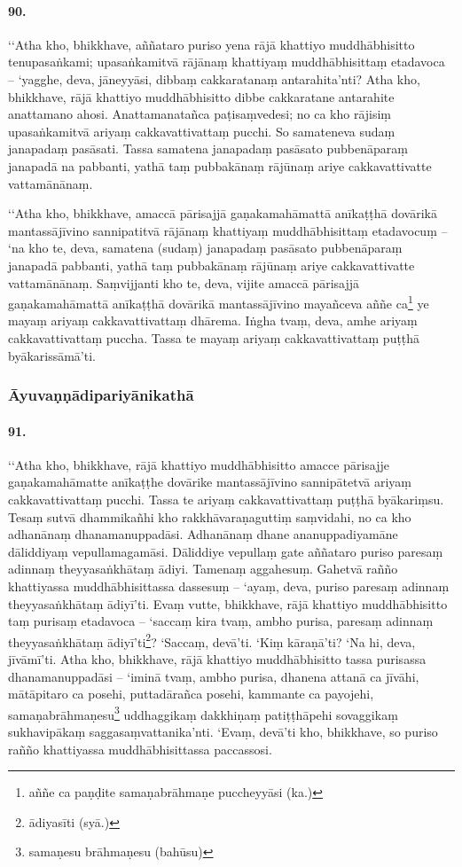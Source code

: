 \paragraph{90.} ‘‘Atha kho, bhikkhave, aññataro puriso yena rājā khattiyo muddhābhisitto tenupasaṅkami; upasaṅkamitvā rājānaṃ khattiyaṃ muddhābhisittaṃ etadavoca – ‘yagghe, deva, jāneyyāsi, dibbaṃ cakkaratanaṃ antarahita’nti? Atha kho, bhikkhave, rājā khattiyo muddhābhisitto dibbe cakkaratane antarahite anattamano ahosi. Anattamanatañca paṭisaṃvedesi; no ca kho rājisiṃ upasaṅkamitvā ariyaṃ cakkavattivattaṃ pucchi. So samateneva sudaṃ janapadaṃ pasāsati. Tassa samatena janapadaṃ pasāsato pubbenāparaṃ janapadā na pabbanti, yathā taṃ pubbakānaṃ rājūnaṃ ariye cakkavattivatte vattamānānaṃ.

‘‘Atha kho, bhikkhave, amaccā pārisajjā gaṇakamahāmattā anīkaṭṭhā dovārikā mantassājīvino sannipatitvā rājānaṃ khattiyaṃ muddhābhisittaṃ etadavocuṃ – ‘na kho te, deva, samatena (sudaṃ) janapadaṃ pasāsato pubbenāparaṃ janapadā pabbanti, yathā taṃ pubbakānaṃ rājūnaṃ ariye cakkavattivatte vattamānānaṃ. Saṃvijjanti kho te, deva, vijite amaccā pārisajjā gaṇakamahāmattā anīkaṭṭhā dovārikā mantassājīvino mayañceva aññe ca\footnote{aññe ca paṇḍite samaṇabrāhmaṇe puccheyyāsi (ka.)} ye mayaṃ ariyaṃ cakkavattivattaṃ dhārema. Iṅgha tvaṃ, deva, amhe ariyaṃ cakkavattivattaṃ puccha. Tassa te mayaṃ ariyaṃ cakkavattivattaṃ puṭṭhā byākarissāmā’ti.

\subsubsection{Āyuvaṇṇādipariyānikathā}

\paragraph{91.} ‘‘Atha kho, bhikkhave, rājā khattiyo muddhābhisitto amacce pārisajje gaṇakamahāmatte anīkaṭṭhe dovārike mantassājīvino sannipātetvā ariyaṃ cakkavattivattaṃ pucchi. Tassa te ariyaṃ cakkavattivattaṃ puṭṭhā byākariṃsu. Tesaṃ sutvā dhammikañhi kho rakkhāvaraṇaguttiṃ saṃvidahi, no ca kho adhanānaṃ dhanamanuppadāsi. Adhanānaṃ dhane ananuppadiyamāne dāliddiyaṃ vepullamagamāsi. Dāliddiye vepullaṃ gate aññataro puriso paresaṃ adinnaṃ theyyasaṅkhātaṃ ādiyi. Tamenaṃ aggahesuṃ. Gahetvā rañño khattiyassa muddhābhisittassa dassesuṃ – ‘ayaṃ, deva, puriso paresaṃ adinnaṃ theyyasaṅkhātaṃ ādiyī’ti. Evaṃ vutte, bhikkhave, rājā khattiyo muddhābhisitto taṃ purisaṃ etadavoca – ‘saccaṃ kira tvaṃ, ambho purisa, paresaṃ adinnaṃ theyyasaṅkhātaṃ ādiyī’ti\footnote{ādiyasīti (syā.)}? ‘Saccaṃ, devā’ti. ‘Kiṃ kāraṇā’ti? ‘Na hi, deva, jīvāmī’ti. Atha kho, bhikkhave, rājā khattiyo muddhābhisitto tassa purisassa dhanamanuppadāsi – ‘iminā tvaṃ, ambho purisa, dhanena attanā ca jīvāhi, mātāpitaro ca posehi, puttadārañca posehi, kammante ca payojehi, samaṇabrāhmaṇesu\footnote{samaṇesu brāhmaṇesu (bahūsu)} uddhaggikaṃ dakkhiṇaṃ patiṭṭhāpehi sovaggikaṃ sukhavipākaṃ saggasaṃvattanika’nti. ‘Evaṃ, devā’ti kho, bhikkhave, so puriso rañño khattiyassa muddhābhisittassa paccassosi.

